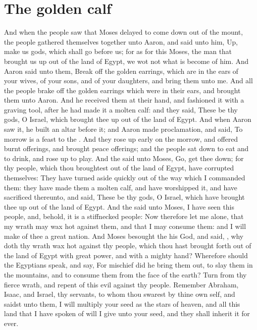 \section*{The golden calf}
\begin{biblechapter} %
\verse And when the people saw that Moses delayed to come down out of the mount, the people gathered themselves together unto Aaron, and said unto him, Up, make us gods, which shall go before us; for as for this Moses, the man that brought us up out of the land of Egypt, we wot not what is become of him.
\verse And Aaron said unto them, Break off the golden earrings, which are in the ears of your wives, of your sons, and of your daughters, and bring them unto me.
\verse And all the people brake off the golden earrings which were in their ears, and brought them unto Aaron.
\verse And he received them at their hand, and fashioned it with a graving tool, after he had made it a molten calf: and they said, These be thy gods, O Israel, which brought thee up out of the land of Egypt.
\verse And when Aaron saw it, he built an altar before it; and Aaron made proclamation, and said, To morrow is a feast to the \LORD.
\verse And they rose up early on the morrow, and offered burnt offerings, and brought peace offerings; and the people sat down to eat and to drink, and rose up to play.
\verse And the \LORD said unto Moses, Go, get thee down; for thy people, which thou broughtest out of the land of Egypt, have corrupted themselves:
\verse They have turned aside quickly out of the way which I commanded them: they have made them a molten calf, and have worshipped it, and have sacrificed thereunto, and said, These be thy gods, O Israel, which have brought thee up out of the land of Egypt.
\verse And the \LORD said unto Moses, I have seen this people, and, behold, it is a stiffnecked people:
\verse Now therefore let me alone, that my wrath may wax hot against them, and that I may consume them: and I will make of thee a great nation.
\verse And Moses besought the \LORD his God, and said, \LORD, why doth thy wrath wax hot against thy people, which thou hast brought forth out of the land of Egypt with great power, and with a mighty hand?
\verse Wherefore should the Egyptians speak, and say, For mischief did he bring them out, to slay them in the mountains, and to consume them from the face of the earth? Turn from thy fierce wrath, and repent of this evil against thy people.
\verse Remember Abraham, Isaac, and Israel, thy servants, to whom thou swarest by thine own self, and saidst unto them, I will multiply your seed as the stars of heaven, and all this land that I have spoken of will I give unto your seed, and they shall inherit it for ever.

\end{biblechapter}
